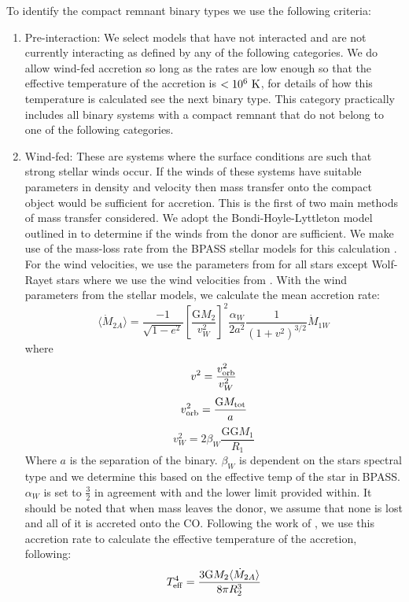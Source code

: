 \documentclass{pas}
\begin{document}
To identify the compact remnant binary types we use the following criteria:
\begin{enumerate}
    \item Pre-interaction: We select models that have not interacted and are not currently interacting as defined by any of the following categories. We do allow wind-fed accretion so long as the rates are low enough so that the effective temperature of the accretion is $<10^6~\rm{K}$, for details of how this temperature is calculated see the next binary type. This category practically includes all binary systems with a compact remnant that do not belong to one of the following categories. 
    
    \item Wind-fed: These are systems where the surface conditions are such that strong stellar winds occur. If the winds of these systems have suitable parameters in density and velocity then mass transfer onto the compact object would be sufficient for accretion. This is the first of two main methods of mass transfer considered. We adopt the Bondi-Hoyle-Lyttleton model \citep{1944MNRAS.104..273B} outlined in \citet{2002MNRAS.329..897H} to determine if the winds from the donor are sufficient. We make use of the mass-loss rate from the \textsc{BPASS} stellar models for this calculation \citep[see][for details]{2017PASA...34...58E}. For the wind velocities, we use the parameters from \citet{2002MNRAS.329..897H} for all stars except Wolf-Rayet stars where we use the wind velocities from \citet{2000A&A...360..227N}. With the wind parameters from the stellar models, we calculate the mean accretion rate: 
\begin{equation}\label{BH1944}
\langle\dot{M}_{2A}\rangle=\frac{-1}{\sqrt{1-e^{2}}}\left[\frac{\textrm{G}M_{2}}{v^{2}_{W}} \right]^{2}\frac{\alpha_W}{2a^{2}}\frac{1}{(1+v^{2})^{3/2}}\dot{M}_{1W}
\end{equation}
where
\begin{equation}\label{vsq}
    v^{2}=\frac{v^{2}_{\rm orb}}{v^{2}_{W}}
\end{equation}
\begin{equation}\label{v2orb}
    v^{2}_{\rm orb}=\frac{\textrm{G}M_{\rm{tot}}}{a}
\end{equation}
\begin{equation}\label{v2wind}
    v^{2}_{W}=2\beta_{W}\frac{\textrm{GG}M_{1}}{R_{1}}
\end{equation}
Where $a$ is the separation of the binary. \(\beta_{W}\) is dependent on the stars spectral type and we determine this based on the effective temp of the star in BPASS. \(\alpha_{W}\) is set to $\frac{3}{2}$ in agreement with \citet{1988A&A...205..155B} and the lower limit provided within. It should be noted that when mass leaves the donor, we assume that none is lost and all of it is accreted onto the CO. Following the work of \citet{2025MNRAS.542.2087B}, we use this accretion rate to calculate the effective temperature of the accretion, following:
\begin{equation}\label{Teffeq}
    T_{\rm eff}^4= \frac{3\textrm{G}M_{2}\langle\dot{M}_{2A}\rangle}{8\pi R_{2}^3}
\end{equation}


\end{enumerate}
\end{document}
